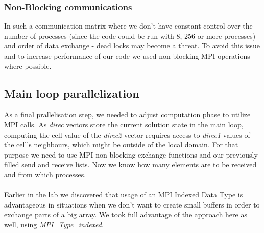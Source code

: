\documentclass{article}
\begin{document}
\subsubsection{Non-Blocking communications}
In such a communication matrix where we don't have constant control over the number of processes (since the code could be run with 8, 256 or more processes) and order of data exchange - dead locks may become a threat. To avoid this issue and to increase performance of our code we used non-blocking MPI operations where possible.

\subsection{Main loop parallelization}
As a final prallelisation step, we needed to adjust computation phase to utilize MPI calls. As \textit{direc} vectors store the current solution state in the main loop, computing the cell value of the \textit{direc2} vector requires access to \textit{direc1} values of the cell’s neighbours, which might be outside of the local domain. For that purpose we need to use MPI non-blocking exchange functions and our previously filled send and receive lists. Now we know how many elements are to be received and from which processes.
\\\\
Earlier in the lab we discovered that usage of an MPI Indexed Data Type is advantageous in situations when we don't want to create small buffers in order to exchange parts of a big array. We took full advantage of the approach here as well, using \textit{MPI\_Type\_indexed}.
\end{document}

